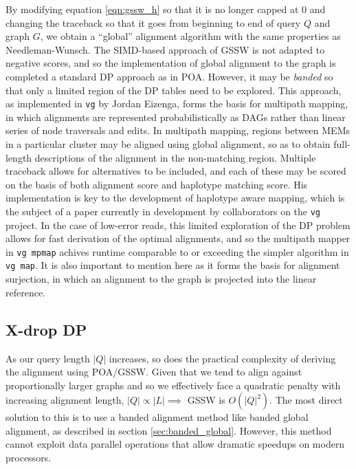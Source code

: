 By modifying equation \ref{eqn:gssw_h} so that it is no longer capped at 0 and changing the traceback so that it goes from beginning to end of query $Q$ and graph $G$, we obtain a ``global'' alignment algorithm with the same properties as Needleman-Wunsch.
The SIMD-based approach of GSSW is not adapted to negative scores, and so the implementation of global alignment to the graph is completed a standard DP approach as in POA.
However, it may be \emph{banded} so that only a limited region of the DP tables need to be explored.
This approach, as implemented in {\tt vg} by Jordan Eizenga, forms the basis for multipath mapping, in which alignments are represented probabilistically as DAGs rather than linear series of node traversals and edits.
In multipath mapping, regions between MEMs in a particular cluster may be aligned using global alignment, so as to obtain full-length descriptions of the alignment in the non-matching region.
Multiple traceback allows for alternatives to be included, and each of these may be scored on the basis of both alignment score and haplotype matching score.
His implementation is key to the development of haplotype aware mapping, which is the subject of a paper currently in development by collaborators on the {\tt vg} project.
In the case of low-error reads, this limited exploration of the DP problem allows for fast derivation of the optimal alignments, and so the multipath mapper in {\tt vg mpmap} achives runtime comparable to or exceeding the simpler algorithm in {\tt vg map}.
It is also important to mention here as it forms the basis for alignment surjection, in which an alignment to the graph is projected into the linear reference.

\subsection{X-drop DP}

As our query length $|Q|$ increases, so does the practical complexity of deriving the alignment using POA/GSSW.
Given that we tend to align against proportionally larger graphs and so we effectively face a quadratic penalty with increasing alignment length, $|Q| \propto |L| \implies$ GSSW is $O(|Q|^2)$.
The most direct solution to this is to use a banded alignment method like banded global alignment, as described in section \ref{sec:banded_global}.
However, this method cannot exploit data parallel operations that allow dramatic speedups on modern processors.

